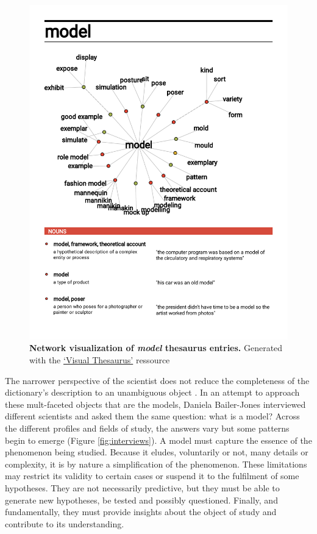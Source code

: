 \documentclass[a4paper,12pt,twoside,onecolumn,openright,final,oldfontcommands]{memoir}
\begin{document}
\begin{figure}

{\centering \includegraphics[width=0.9\linewidth]{fig/visualThesaurus} 

}

\caption[Network visualization of *model* thesaurus entries]{\textbf{Network visualization of
\emph{model} thesaurus entries.} Generated with the
\href{https://www.visualthesaurus.com}{`Visual Thesaurus'} ressource}\label{fig:visual-thesaurus}
\end{figure}





The narrower perspective of the scientist does not reduce the
completeness of the dictionary's description to an unambiguous object
\citep{bailer2002scientists}. In an attempt to approach these
mult-faceted objects that are the models, Daniela Bailer-Jones
interviewed different scientists and asked them the same question: what
is a model? Across the different profiles and fields of study, the
answers vary but some patterns begin to emerge (Figure
\ref{fig:interviews}). A model must capture the essence of the
phenomenon being studied. Because it eludes, voluntarily or not, many
details or complexity, it is by nature a simplification of the
phenomenon. These limitations may restrict its validity to certain cases
or suspend it to the fulfilment of some hypotheses. They are not
necessarily predictive, but they must be able to generate new
hypotheses, be tested and possibly questioned. Finally, and
fundamentally, they must provide insights about the object of study and
contribute to its understanding.
\end{document}
